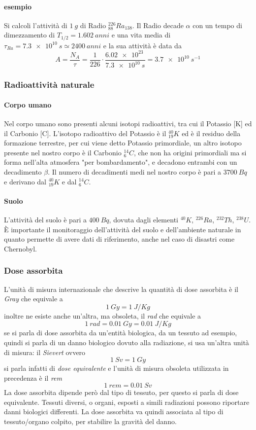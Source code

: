 \paragraph{esempio} Si calcoli l'attività di $\SI{1}{g}$ di Radio $^{226}_{88} Ra_{138}$.
Il Radio decade $\alpha$ con un tempo di dimezzamento di $T_{1/2} = \SI{1.602}{anni}$ e una vita media di $\tau_{Ra} = \SI{7.3e10}{s} \simeq \SI{2400}{anni}$ e la sua attività è data da
\begin{equation}
A = \frac{N_A}{\tau} = \frac{1}{226} \cdot \frac{\SI{6.02e23}{}}{\SI{7.3e10}{s}} = \SI{3.7e10}{s^{-1}}
\end{equation}

\subsubsection{Radioattività naturale}
\paragraph{Corpo umano} Nel corpo umano sono presenti alcuni isotopi radioattivi, tra cui il Potassio [K] ed il Carbonio [C].
L'isotopo radioattivo del Potassio è il $^{40}_{19}K$ ed è il residuo della formazione terrestre, per cui viene detto Potassio primordiale, un altro isotopo presente nel nostro corpo è il Carbonio $^{14}_{6}C$, che non ha origini primordiali ma si forma nell'alta atmosfera "per bombardamento", e decadono entrambi con un decadimento $\beta$.
Il numero di decadimenti medi nel nostro corpo è pari a $\SI{3700}{Bq}$ e derivano dal $^{40}_{19}K$ e dal $^{14}_{6}C$.
\paragraph{Suolo} L'attività del suolo è pari a $\SI{400}{Bq}$, dovuta dagli elementi $^{40}K$, $^{226}Ra$, $^{232}Th$, $^{238}U$.
È importante il monitoraggio dell'attività del suolo e dell'ambiente naturale in quanto permette di avere dati di riferimento, anche nel caso di disastri come Chernobyl.

\subsubsection{Dose assorbita}
L'unità di misura internazionale che descrive la quantità di dose assorbita è il \emph{Gray} che equivale a
$$ \SI{1}{Gy} = \SI{1}{J/Kg} $$
inoltre ne esiste anche un'altra, ma obsoleta, il \emph{rad} che equivale a
$$ \SI{1}{rad} = \SI{0.01}{Gy} = \SI{0.01}{J/Kg}$$
se si parla di dose assorbita da un'entità biologica, da un tessuto ad esempio, quindi si parla di un danno biologico dovuto alla radiazione, si usa un'altra unità di misura: il \emph{Sievert} ovvero
$$ \SI{1}{Sv} = \SI{1}{Gy} $$
si parla infatti di \emph{dose equivalente} e l'unità di misura obsoleta utilizzata in precedenza è il \emph{rem} 
$$ \SI{1}{rem} = \SI{0.01}{Sv} $$
La dose assorbita dipende però dal tipo di tessuto, per questo si parla di dose equivalente.
Tessuti diversi, o organi, esposti a simili radiazioni possono riportare danni biologici differenti.
La dose assorbita va quindi associata al tipo di tessuto/organo colpito, per stabilire la gravità del danno.

